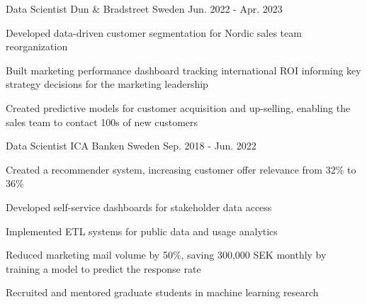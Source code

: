 \begin{cventries}
  \cventry
    {Data Scientist} %
    {Dun \& Bradstreet} %
    {Sweden} %
    {Jun. 2022 - Apr. 2023} %
    {
      \begin{cvitems} %
        \item {Developed data-driven customer segmentation for Nordic sales team reorganization}
        \item {Built marketing performance dashboard tracking international ROI informing key strategy decisions for the marketing leadership}
        \item {Created predictive models for customer acquisition and up-selling, enabling the sales team to contact 100s of new customers}
      \end{cvitems}
    }

  \cventry
    {Data Scientist} %
    {ICA Banken} %
    {Sweden} %
    {Sep. 2018 - Jun. 2022} %
    {
      \begin{cvitems} %
        \item {Created a recommender system, increasing customer offer relevance from 32\% to 36\%}
        \item {Developed self-service dashboards for stakeholder data access}
        \item {Implemented ETL systems for public data and usage analytics}
        \item {Reduced marketing mail volume by 50\%, saving 300,000 SEK monthly by training a model to predict the response rate}
        \item {Recruited and mentored graduate students in machine learning research}
      \end{cvitems}
    }

\end{cventries}
